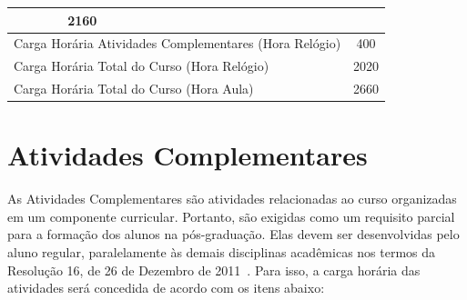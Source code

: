 \documentclass[
	10pt,				%
	openright,			%
	twoside,			%
	a4paper,			%
	english,			%
	french,				%
	brazil,				%
	sumario=tradicional
]{abntex2}
\begin{document}
\begin{table}[H]
{\begin{tabular}{|l|l|c|c|c|}
			& 2160                 \\ \hline
			\multicolumn{4}{|l|}{Carga Horária Atividades Complementares (Hora Relógio)}                                                                                                                                                                                     
			& 400                 \\ \hline
			\multicolumn{4}{|l|}{Carga Horária Total do Curso (Hora Relógio)}                                                                                                                                                                                        
			& 2020                 \\ \hline
			\multicolumn{4}{|l|}{Carga Horária Total do Curso (Hora Aula)}                                                                                                                                                                                        
			& 2660                 \\ \hline			
		\end{tabular}%
	}
\end{table}

\section*{Atividades Complementares}

As Atividades Complementares são atividades relacionadas ao curso organizadas em um componente curricular.
Portanto, são exigidas como um requisito parcial para a formação dos alunos na pós-graduação.
Elas devem ser desenvolvidas pelo aluno regular, paralelamente às demais disciplinas acadêmicas nos termos da Resolução 16, de 26 de Dezembro de 2011~\cite{Resolucao16De2011}.
Para isso, a carga horária das atividades será concedida de acordo com os itens abaixo:
\end{document}
